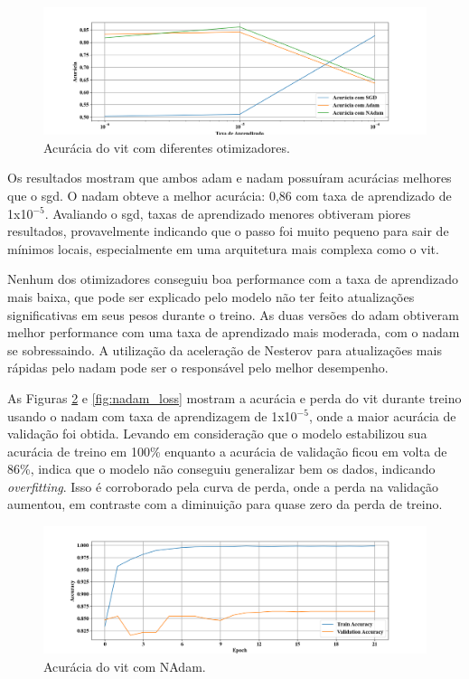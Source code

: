 \begin{figure}[tb]
\centerline{\includegraphics[width=1\linewidth]{images/resultados/optimizer_acc.png}}
\caption{Acurácia do \acrshort{vit} com diferentes otimizadores.}
\label{fig:optmizer_acc}
\end{figure}

Os resultados mostram que ambos \acrshort{adam} e \acrshort{nadam} possuíram acurácias melhores que o \acrshort{sgd}. 
O \acrshort{nadam} obteve a melhor acurácia: 0,86 com taxa de aprendizado de 1x10$^{-5}$.
Avaliando o \acrshort{sgd}, taxas de aprendizado menores obtiveram piores resultados, provavelmente indicando que o passo foi muito pequeno para sair de mínimos locais, especialmente em uma arquitetura mais complexa como o \acrshort{vit}. 

Nenhum dos otimizadores conseguiu boa performance com a taxa de aprendizado mais baixa, 
que pode ser explicado pelo modelo não ter feito atualizações significativas em seus pesos durante o treino.
As duas versões do \acrshort{adam} obtiveram melhor performance com uma taxa de aprendizado mais moderada, com o \acrshort{nadam} se sobressaindo. 
A utilização da aceleração de Nesterov para atualizações mais rápidas pelo \acrshort{nadam} pode ser o responsável pelo melhor desempenho.

As Figuras \ref{fig:nadam_acc} e \ref{fig:nadam_loss} mostram a acurácia e perda do \acrshort{vit} durante treino 
usando o \acrshort{nadam} com taxa de aprendizagem de 1x10$^{-5}$, onde a maior acurácia de validação foi obtida.
Levando em consideração que o modelo estabilizou sua acurácia de treino em 100\% enquanto a acurácia de validação ficou em volta de 86\%,
indica que o modelo não conseguiu generalizar bem os dados, indicando \textit{overfitting}.
Isso é corroborado pela curva de perda, onde a perda na validação aumentou, em contraste com a diminuição para quase zero da perda de treino.

\begin{figure}[tb]
\centerline{\includegraphics[width=1\linewidth]{images/resultados/nadam_accuracy.png}}
\caption{Acurácia do \acrshort{vit} com NAdam.}
\label{fig:nadam_acc}
\end{figure}

